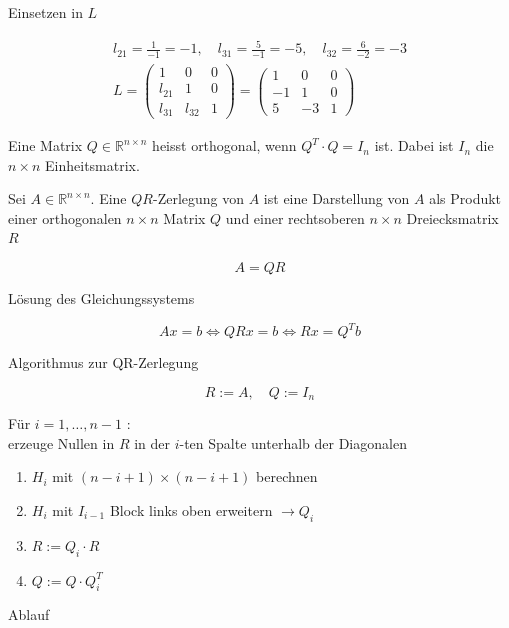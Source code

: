 \documentclass[10pt]{article}
\begin{document}
Einsetzen in $L$

$$
\begin{gathered}
l_{21}=\frac{1}{-1}=-1, \quad l_{31}=\frac{5}{-1}=-5, \quad l_{32}=\frac{6}{-2}=-3 \\
L=\left(\begin{array}{ccc}
1 & 0 & 0 \\
l_{21} & 1 & 0 \\
l_{31} & l_{32} & 1
\end{array}\right)=\left(\begin{array}{ccc}
1 & 0 & 0 \\
-1 & 1 & 0 \\
5 & -3 & 1
\end{array}\right)
\end{gathered}
$$

Eine Matrix $Q \in \mathbb{R}^{n \times n}$ heisst orthogonal, wenn $Q^{T} \cdot Q=I_{n}$ ist. Dabei ist $I_{n}$ die $n \times n$ Einheitsmatrix.

Sei $A \in \mathbb{R}^{n \times n}$. Eine $Q R$-Zerlegung von $A$ ist eine Darstellung von $A$ als Produkt einer orthogonalen $n \times n$ Matrix $Q$ und einer rechtsoberen $n \times n$ Dreiecksmatrix $R$

$$
A=Q R
$$

Lösung des Gleichungssystems

$$
A x=b \Leftrightarrow Q R x=b \Leftrightarrow R x=Q^{T} b
$$

Algorithmus zur QR-Zerlegung

$$
R:=A, \quad Q:=I_{n}
$$

Für $i=1, \ldots, n-1$ :\\
erzeuge Nullen in $R$ in der $i$-ten Spalte unterhalb der Diagonalen

\begin{enumerate}
  \item $H_{i}$ mit $(n-i+1) \times(n-i+1)$ berechnen
  \item $H_{i}$ mit $I_{i-1}$ Block links oben erweitern $\rightarrow Q_{i}$
  \item $R:=Q_{i} \cdot R$
  \item $Q:=Q \cdot Q_{i}^{T}$
\end{enumerate}

Ablauf
\end{document}
